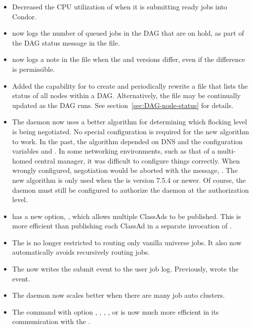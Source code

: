 \begin{itemize}
\item Decreased the CPU utilization of  when it is
	submitting ready jobs into Condor.

\item {} now logs the number of queued jobs in the DAG
that are on hold,
as part of the DAG status message in the  file.

\item {} now logs a note in the  file
when the  and  versions differ,
even if the difference is permissible.

\item Added the capability for  to create and periodically
rewrite a file that lists the status of all nodes within a DAG.
Alternatively, the file may be continually updated as the DAG runs.
See section~\ref{sec:DAG-node-status} for details.

\item The  daemon now uses a better algorithm for
determining which flocking level is being negotiated.  No special
configuration is required for the new algorithm to work.  In the
past, the algorithm depended on DNS and the
configuration variables  and
.  In some networking environments,
such as that of a multi-homed central manager, it was difficult to
configure things correctly.  When wrongly configured, negotiation
would be aborted with the message, .  The new
algorithm is only used when the  is version 7.5.4 or
newer.  Of course, the  daemon must still be configured to
authorize the  daemon at the 
authorization level.

\item {} has a new option, , which
allows multiple ClassAds to be published.  This is more efficient than
publishing each ClassAd in a separate invocation of .

\item The  is no longer restricted to routing only vanilla
universe jobs.  It also now automatically avoids recursively routing jobs.

\item The  now writes the submit event to the user job log.
Previously,  wrote the event.

\item The  daemon now scales better when there are many
job auto clusters.

\item The  command with option , , 
, ,  or 
is now much more efficient in its communication with the .

\end{itemize}

